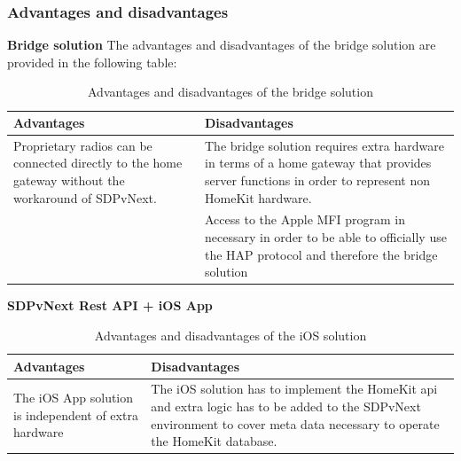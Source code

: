 				\pagebreak

		\subsubsection{Advantages and disadvantages}
			\textbf{Bridge solution}
				The advantages and disadvantages of the bridge solution are provided in the following table:

				\begin{table}[h]
					\centering
					\caption{Advantages and disadvantages of the bridge solution}
					\label{Homekit_Accessory_Profile}
					\begin{tabular}{p{5cm}p{5cm}}
						\textbf{Advantages}		& \textbf{Disadvantages} \\
						\hline
						Proprietary radios can be connected directly to the home gateway without the workaround of SDPvNext.		& The bridge solution requires extra hardware in terms of a home gateway that provides server functions in order to represent non HomeKit hardware. \\
											& Access to the Apple MFI program in necessary in order to be able to officially use the HAP protocol and therefore the bridge solution\\
					\end{tabular}
				\end{table}
				

			\textbf{SDPvNext Rest API + iOS App}
				\begin{table}[h]
					\centering
					\caption{Advantages and disadvantages of the iOS solution}
					\label{Homekit_Accessory_Profile}
					\begin{tabular}{p{5cm}p{5cm}}
						\textbf{Advantages}		& \textbf{Disadvantages} \\
						\hline
						The iOS App solution is independent of extra hardware		& The iOS solution has to implement the HomeKit api and extra logic has to be added to the SDPvNext environment to cover meta data necessary to operate the HomeKit database. \\
					\end{tabular}
				\end{table}

				\pagebreak
				



